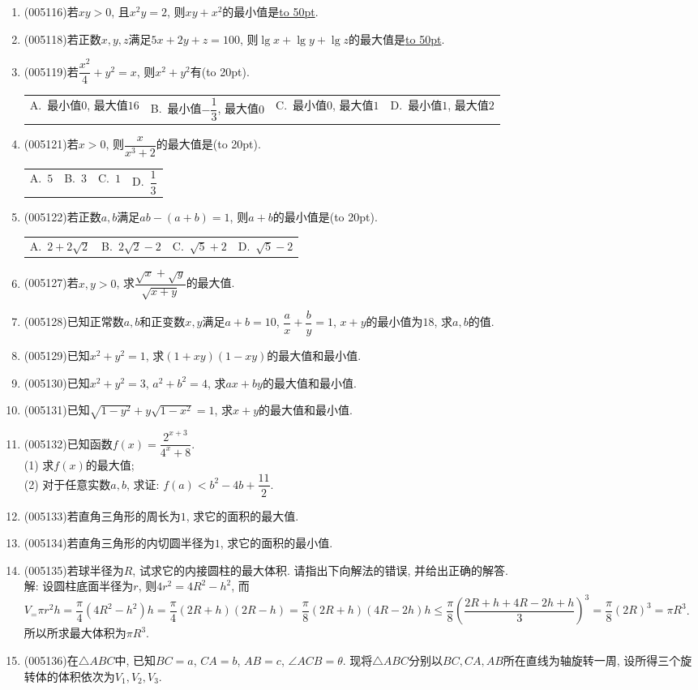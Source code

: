 \documentclass[10pt,a4paper]{article}
\newcommand{\blank}[1]{\underline{\hbox to #1pt{}}}
\newcommand{\bracket}[1]{(\hbox to #1pt{})}
\newcommand{\fourch}[4]{\par\begin{tabular}{p{.23\textwidth}p{.23\textwidth}p{.23\textwidth}p{.23\textwidth}}
A.~#1 &B.~#2& C.~#3& D.~#4
\end{tabular}}
\begin{document}
\begin{enumerate}[1.]
\item {\tiny (005116)}若$xy>0$, 且$x^2y=2$, 则$xy+x^2$的最小值是\blank{50}.
\item {\tiny (005118)}若正数$x,y,z$满足$5x+2y+z=100$, 则$\lg x+\lg y+\lg z$的最大值是\blank{50}.
\item {\tiny (005119)}若$\dfrac{x^2}4+{y^2}=x$, 则$x^2+y^2$有\bracket{20}.
\fourch{最小值$0$, 最大值$16$}{最小值$-\dfrac 13$, 最大值$0$}{最小值$0$, 最大值$1$}{最小值$1$, 最大值$2$}
\item {\tiny (005121)}若$x>0$, 则$\dfrac x{x^3+2}$的最大值是\bracket{20}.
\fourch{$5$}{$3$}{$1$}{$\dfrac 13$}
\item {\tiny (005122)}若正数$a,b$满足$ab-(a+b)=1$, 则$a+b$的最小值是\bracket{20}.
\fourch{$2+2\sqrt 2$}{$2\sqrt 2-2$}{$\sqrt 5+2$}{$\sqrt 5-2$}
\item {\tiny (005127)}若$x,y>0$, 求$\dfrac{\sqrt x+\sqrt y}{\sqrt{x+y}}$的最大值.
\item {\tiny (005128)}已知正常数$a,b$和正变数$x,y$满足$a+b=10$, $\dfrac ax+\dfrac by=1$, $x+y$的最小值为$18$, 求$a,b$的值.
\item {\tiny (005129)}已知$x^2+y^2=1$, 求$(1+xy)(1-xy)$的最大值和最小值.
\item {\tiny (005130)}已知$x^2+y^2=3$, $a^2+b^2=4$, 求$ax+by$的最大值和最小值.
\item {\tiny (005131)}已知$\sqrt{1-y^2}+y\sqrt{1-x^2}=1$, 求$x+y$的最大值和最小值.
\item {\tiny (005132)}已知函数$f(x)=\dfrac{2^{x+3}}{{4^x}+8}$.\\
(1) 求$f(x)$的最大值;\\
(2) 对于任意实数$a,b$, 求证: $f(a)<b^2-4b+\dfrac{11}2$.
\item {\tiny (005133)}若直角三角形的周长为$1$, 求它的面积的最大值.
\item {\tiny (005134)}若直角三角形的内切圆半径为$1$, 求它的面积的最小值.
\item {\tiny (005135)}若球半径为$R$, 试求它的内接圆柱的最大体积. 请指出下向解法的错误, 并给出正确的解答.\\
解: 设圆柱底面半径为$r$, 则$4r^2=4R^2-h^2$, 而$V_=\pi {r^2}h=\dfrac{\pi}4(4{R^2}-{h^2})h=\dfrac{\pi }4(2R+h)(2R-h)=\dfrac{\pi}8(2R+h)(4R-2h)h\le \dfrac{\pi}8(\dfrac{2R+h+4R-2h+h}3)^3=\dfrac{\pi}8(2R)^3=\pi R^3$. 所以所求最大体积为$\pi R^3$.
\item {\tiny (005136)}在$\triangle ABC$中, 已知$BC=a$, $CA=b$, $AB=c$, $\angle ACB=\theta$. 现将$\triangle ABC$分别以$BC,CA,AB$所在直线为轴旋转一周, 设所得三个旋转体的体积依次为$V_1,V_2,V_3$.\\

\end{enumerate}
\end{document}
